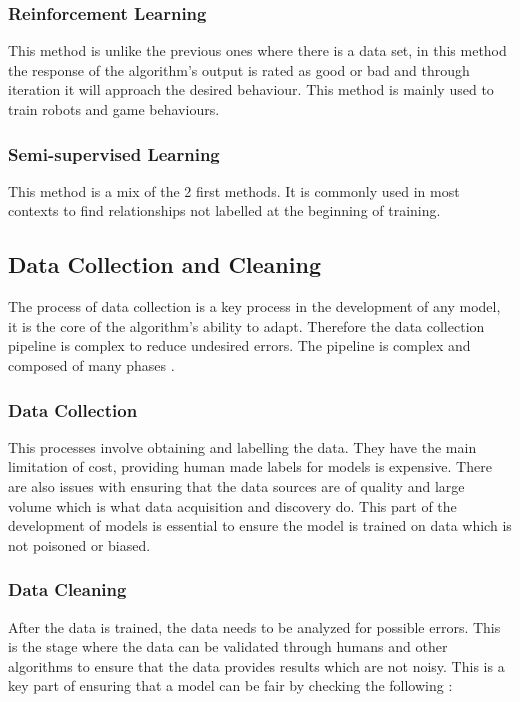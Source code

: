 \subsubsection{Reinforcement Learning}
This method is unlike the previous ones where there is a data set, in this method the response of the algorithm's output is rated as good or bad and through iteration it will approach the desired behaviour. This method is mainly used to train robots and game behaviours. \cite{ReinforcementLearning}

\subsubsection{Semi-supervised Learning}
This method is a mix of the 2 first methods. It is commonly used in most contexts to find relationships not labelled at the beginning of training. \cite{IBM-MachineLearningTypes}

\subsection{Data Collection and Cleaning}
The process of data collection is a key process in the development of any model, it is the core of the algorithm's ability to adapt. Therefore the data collection pipeline is complex to reduce undesired errors. The pipeline is complex and composed of many phases \cite{DataCollection}.

\subsubsection{Data Collection}
This processes involve obtaining and labelling the data. They have the main limitation of cost, providing human made labels for models is expensive. There are also issues with ensuring that the data sources are of quality and large volume which is what data acquisition and discovery do. This part of the development of models is essential to ensure the model is trained on data which is not poisoned or biased.

\subsubsection{Data Cleaning}
After the data is trained, the data needs to be analyzed for possible errors. This is the stage where the data can be validated through humans and other algorithms to ensure that the data provides results which are not noisy. This is a key part of ensuring that a model can be fair by checking the following \cite{DataCleaning}:

